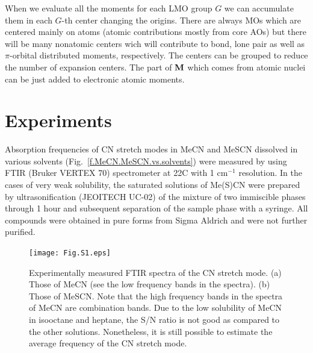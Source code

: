 \documentclass[a4paper,titlepage,twoside,fleqn,12pt]{book}
\begin{document}
\begin{appendices}
\begin{refsection}
When we evaluate all the moments for each LMO group $G$ we can accumulate them in each $G$-th center
changing the origins. There are always MOs which are centered mainly on atoms (atomic contributions
mostly from core AOs) but there will be many nonatomic centers wich will contribute to bond, lone pair
as well as $\pi$\hyp{}orbital distributed moments, respectively. The centers can be grouped to reduce the number
of expansion centers. The part of $\bf M$ which comes from atomic
nuclei can be just added to electronic atomic moments.

\printbibliography[heading=subbibintoc,title={References}]
\end{refsection}

\chapter{Experiments\label{a:exp-ftir}}

Absorption frequencies of CN stretch modes in MeCN and MeSCN dissolved in various
solvents (Fig.~\ref{f.MeCN.MeSCN.vs.solvents}) were measured by using FTIR (Bruker VERTEX 70) 
spectrometer at 22{\degree}C with 1 cm$^{-1}$ 
resolution. In the cases of very weak solubility, the saturated solutions of Me(S)CN were 
prepared by ultrasonification (JEOITECH UC-02) of the mixture of two immiscible phases 
through 1 hour and subsequent separation of the sample phase with a syringe. All compounds 
were obtained in pure forms from Sigma Aldrich and were not further purified.
%
\begin{figure}[ht]
\centering
\setlength\fboxsep{0.4pt}
\setlength\fboxrule{0.5pt}
\texttt{[image: Fig.S1.eps]}
\caption{Experimentally measured FTIR spectra of the CN stretch mode. (a) Those of
MeCN (see the low frequency bands in the spectra). (b) Those of MeSCN. Note that the high 
frequency bands in the spectra of MeCN are combination bands. Due to the low solubility of 
MeCN in isooctane and heptane, the S/N ratio is not good as compared to the other solutions. 
Nonetheless, it is still possible to estimate the average frequency of the CN stretch mode.
\label{f.MeCN.MeSCN.vs.solvents.spectra}}
\end{figure}
%



\end{appendices}

%
%
\end{document}
